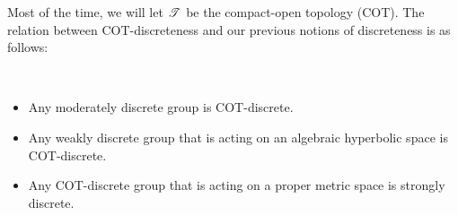 Most of the time, we will let $\mathscr T$ be the compact-open topology (COT). The relation between COT-discreteness and our previous notions of discreteness is as follows:
\begin{proposition}
\label{propositionparametricdiscreteness}~
\begin{itemize}
\item[(i)] Any moderately discrete group is COT-discrete.
\item[(ii)] Any weakly discrete group that is acting on an algebraic hyperbolic space is COT-discrete.%
\item[(iii)] Any COT-discrete group that is acting on a proper metric space is strongly discrete.
\end{itemize}
\end{proposition}
